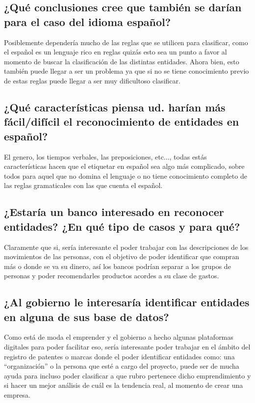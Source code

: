 \documentclass{article}
\begin{document}
\subsection{¿Qué conclusiones cree que también se darían para el caso del idioma español?}
Posiblemente dependería mucho de las reglas que se utilicen para clasificar, como el español es un lenguaje rico en reglas quizás esto sea un punto a favor al momento de buscar la clasificación de las distintas entidades. Ahora bien, esto también puede llegar a ser un problema ya que si no se tiene conocimiento previo de estas reglas puede llegar a ser muy dificultoso clasificar.

\subsection{¿Qué características piensa ud. harían más fácil/difícil el reconocimiento de entidades en español?}
El genero, los tiempos verbales, las preposiciones, etc..., todas estás características hacen que el etiquetar en español sea algo más complicado, sobre todos para aquel que no domina el lenguaje o no tiene conocimiento completo de las reglas gramaticales con las que cuenta el español.

\subsection{¿Estaría un banco interesado en reconocer entidades? ¿En qué tipo de casos y para qué?}
Claramente que si, sería interesante el poder trabajar con las descripciones de los movimientos de las personas, con el objetivo de poder identificar que compran más o donde se va su dinero, así los bancos podrían separar a los grupos de personas y poder recomendarles productos acordes a su clase de gastos.

\subsection{¿Al gobierno le interesaría identificar entidades en alguna de sus base de datos?}
Como está de moda el emprender y el gobierno a hecho algunas plataformas digitales para poder facilitar eso, sería interesante poder trabajar en el ámbito del registro de patentes o marcas donde el poder identificar entidades como: una ``organización'' o la persona que esté a cargo del proyecto, puede ser de mucha ayuda para incluso poder clasificar a que rubro pertenece dicho emprendimiento y si hacer un mejor análisis de cuál es la tendencia real, al momento de crear una empresa.
\end{document}
